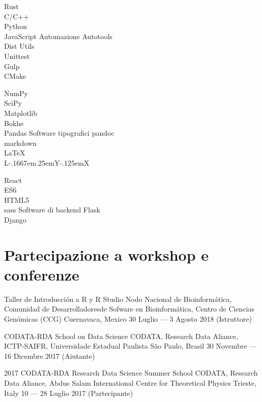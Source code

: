 \documentclass[12pt,english]{moderncv}
\makeatletter
\providecommand{\LyX}{\texorpdfstring%
  {L\kern-.1667em\lower.25em\hbox{Y}\kern-.125emX\@}
  {LyX}}
\makeatother
\begin{document}
   {Rust\\C/C++\\Python\\JavaScript}
           {Automazione}    {Autotools\\Dist Utils\\Unittest\\Gulp\\CMake}

    {NumPy\\SciPy\\Matplotlib\\Bokhe\\Pandas}
           {Software tipografici}    {pandoc\\markdown\\\LaTeX{}\\\LyX{}}


    {React\\ES6\\HTML5\\sass}
           {Software di backend}       {Flask\\Django}


\section{Partecipazione a workshop e conferenze}

        {Taller de Introducción a R y R Studio}
        {%
            Nodo Nacional de Bioinformática, Comunidad de Desarrolladoresde
            Sofware en Bioinformática, Centro de Ciencias Genómicas (CCG)
        }
        {Cuernavaca, Mexico}
        {30 Luglio --- 3 Agosto 2018}
        {(Istruttore)}

        {CODATA-RDA School on Data Science}
        {CODATA, Research Data Aliance, ICTP-SAIFR, Universidade Estadual Paulista}
        {São Paulo, Brasil}
        {30 Novembre --- 16 Dicembre 2017}
        {(Aiutante)}

        {2017 CODATA-RDA Research Data Science Summer School}
        {CODATA, Research Data Aliance, Abdus Salam International Centre for Theoretical Physics}
        {Trieste, Italy}
        {10 --- 28 Luglio 2017}
        {(Partecipante)}
\end{document}
